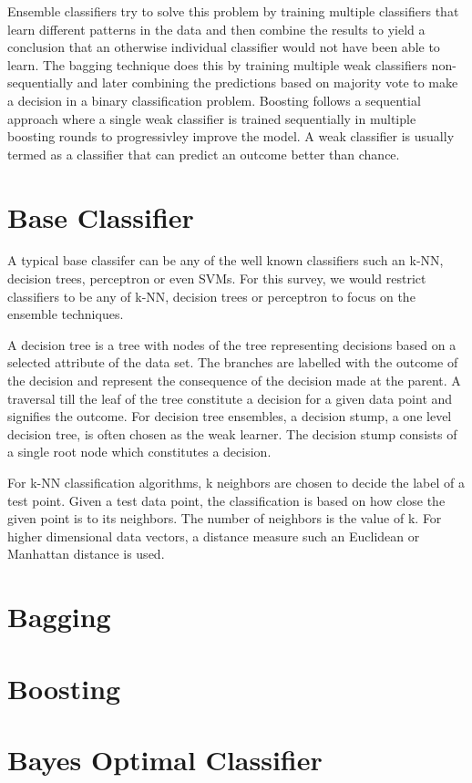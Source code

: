 \documentclass{acmtog} %
\begin{document}
Ensemble classifiers try to solve this problem by training multiple classifiers that learn different patterns in the data and then combine the results to yield a conclusion that an otherwise individual classifier would not have been able to learn. The bagging technique does this by training multiple weak classifiers non-sequentially and later combining the predictions based on majority vote to make a decision in a binary classification problem. Boosting follows a sequential approach where a single weak classifier is trained sequentially in multiple boosting rounds to progressivley improve the model. A weak classifier is usually termed as a classifier that can predict an outcome better than chance. 


\section{Base Classifier}
A typical base classifer can be any of the well known classifiers such an k-NN, decision trees, perceptron or even SVMs. For this survey, we would restrict classifiers to be any of k-NN, decision trees or perceptron to focus on the ensemble techniques. 

A decision tree is a tree with nodes of the tree representing decisions based on a selected attribute of the data set. The branches are labelled with the outcome of the decision and represent the consequence of the decision made at the parent. A traversal till the leaf of the tree constitute a decision for a given data point and signifies the outcome. For decision tree ensembles, a decision stump, a one level decision tree, is often chosen as the weak learner. The decision stump consists of a single root node which constitutes a decision. 

For k-NN classification algorithms, k neighbors are chosen to decide the label of a test point. Given a test data point, the classification is based on how close the given point is to its neighbors. The number of neighbors is the value of k. For higher dimensional data vectors, a distance measure such an Euclidean or Manhattan distance is used. 


\section{Bagging}
\section{Boosting}
\section{Bayes Optimal Classifier}
\end{document}
